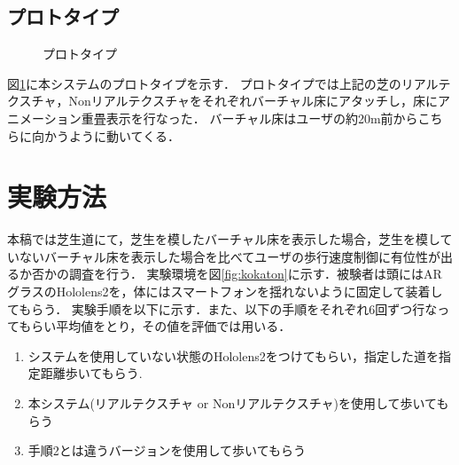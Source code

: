 \documentclass[dvipdfmx]{jsarticle}
\begin{document}
\subsection{プロトタイプ}
\begin{figure}[t]
    \centering
    \caption{プロトタイプ}
    \label{fig:puroto}
\end{figure}
図\ref{fig:puroto}に本システムのプロトタイプを示す．
プロトタイプでは上記の芝のリアルテクスチャ，Nonリアルテクスチャをそれぞれバーチャル床にアタッチし，床にアニメーション重畳表示を行なった．
バーチャル床はユーザの約20m前からこちらに向かうように動いてくる．
\section{実験方法}

本稿では芝生道にて，芝生を模したバーチャル床を表示した場合，芝生を模していないバーチャル床を表示した場合を比べてユーザの歩行速度制御に有位性が出るか否かの調査を行う．
実験環境を図\ref{fig:kokaton}に示す．被験者は頭にはARグラスのHololens2を，体にはスマートフォンを揺れないように固定して装着してもらう．
実験手順を以下に示す．また、以下の手順をそれぞれ6回ずつ行なってもらい平均値をとり，その値を評価では用いる．
\begin{enumerate}
    \item システムを使用していない状態のHololens2をつけてもらい，指定した道を指定距離歩いてもらう.
    \item 本システム(リアルテクスチャ or Nonリアルテクスチャ)を使用して歩いてもらう
    \item 手順2とは違うバージョンを使用して歩いてもらう
\end{enumerate}
\end{document}

